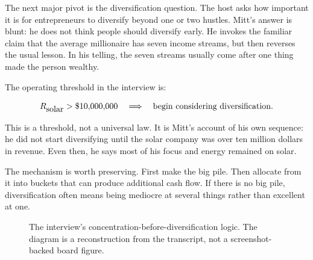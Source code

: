 The next major pivot is the diversification question. The host asks how important it is for entrepreneurs to diversify beyond one or two hustles. Mitt's answer is blunt: he does not think people should diversify early. He invokes the familiar claim that the average millionaire has seven income streams, but then reverses the usual lesson. In his telling, the seven streams usually come after one thing made the person wealthy.

The operating threshold in the interview is:

\begin{equation}
  R_{\hbox{solar}} > \$10{,}000{,}000
  \quad \Longrightarrow \quad
  \hbox{begin considering diversification}.
\end{equation}

This is a threshold, not a universal law. It is Mitt's account of his own sequence: he did not start diversifying until the solar company was over ten million dollars in revenue. Even then, he says most of his focus and energy remained on solar.

The mechanism is worth preserving. First make the big pile. Then allocate from it into buckets that can produce additional cash flow. If there is no big pile, diversification often means being mediocre at several things rather than excellent at one.

\begin{figure}
\centering
{}
\caption{The interview's concentration-before-diversification logic. The diagram is a reconstruction from the transcript, not a screenshot-backed board figure.}
\end{figure}

